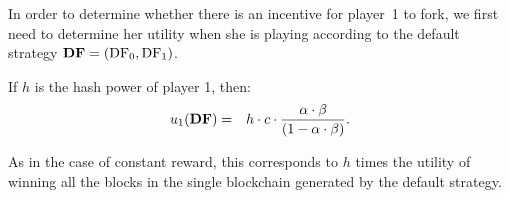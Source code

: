 In order to determine whether there is an incentive for player~1 to fork, we first need to determine her utility when she is playing according to the default strategy $\text{\rm {\bf DF}} = (\text{\rm DF}_0,\text{\rm DF}_1)$. 

\begin{lemma}\label{lem:default_utility}
If $h$ is the hash power of player 1, then:
\begin{eqnarray*}
u_1(\text{\rm {\bf DF}}) & = & h\cdot c\cdot\frac{\alpha\cdot\beta}{(1-\alpha\cdot\beta)}.
\end{eqnarray*}
\end{lemma}
As in the case of constant reward, this corresponds to $h$ times the utility of winning all the blocks in the single blockchain generated by the default strategy.


